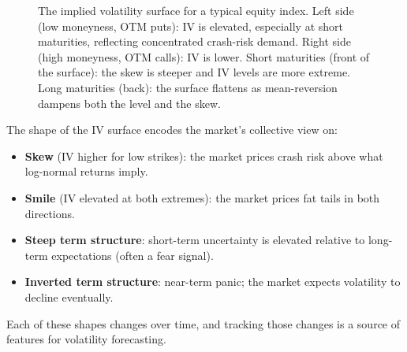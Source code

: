 \begin{figure}[htbp]
\centering
{}
\caption{The implied volatility surface for a typical equity index.
Left side (low moneyness, OTM puts): IV is elevated, especially at short maturities, reflecting concentrated crash-risk demand.
Right side (high moneyness, OTM calls): IV is lower.
Short maturities (front of the surface): the skew is steeper and IV levels are more extreme.
Long maturities (back): the surface flattens as mean-reversion dampens both the level and the skew.}
\label{fig:iv-surface-3d}
\end{figure}

\begin{keyidea}
The shape of the IV surface encodes the market's collective view on:
\begin{itemize}[nosep]
  \item \textbf{Skew} (IV higher for low strikes): the market prices crash risk above what log-normal returns imply.
  \item \textbf{Smile} (IV elevated at both extremes): the market prices fat tails in both directions.
  \item \textbf{Steep term structure}: short-term uncertainty is elevated relative to long-term expectations (often a fear signal).
  \item \textbf{Inverted term structure}: near-term panic; the market expects volatility to decline eventually.
\end{itemize}
Each of these shapes changes over time, and tracking those changes is a source of features for volatility forecasting.
\end{keyidea}

